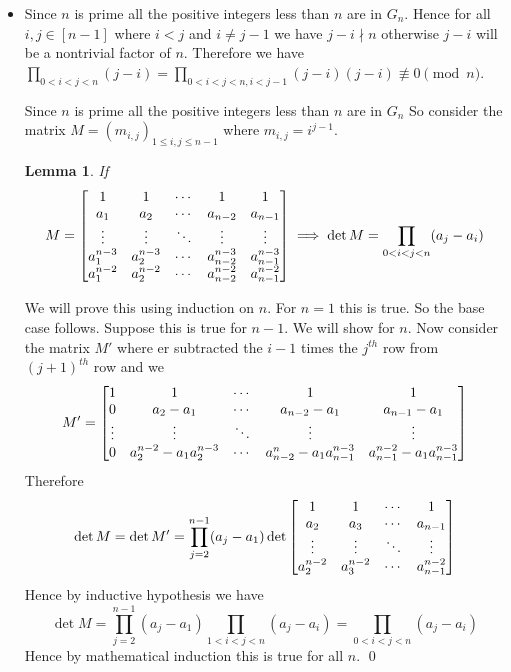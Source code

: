 \documentclass[a4paper, 11pt]{article}
\newtheorem{lemma}{Lemma}
\renewenvironment{proof}{\noindent{\it \textbf{Proof:}}\hspace*{1em}}{\hfill\qed\bigskip\\}
\begin{document}
{\begin{itemize}
\begin{itemize}
		\item \textbf{Commutativity:} Let $a,b\in G_n$. Now we know multiplication of integers follows commutativity. Therefore $a\cdot b=b\cdot a$. Therefore going modulo $n$ we have $a\cdot b\bmod n=b\cdot a\bmod n\implies a\cdot b\equiv b\cdot a\pmod n$.
	\end{itemize}
Therefore $G_n$ is a finite Abelian group.
\item Since $n$ is prime all the positive integers less than $n$ are in $G_n$. Hence for all $i,j\in [n-1]$ where $i<j$ and $i\neq j-1$ we have $j-i\nmid n$ otherwise $j-i$ will be a nontrivial factor of $n$. Therefore we have $\prod\limits_{0<i<j<n}(j-i)=\prod\limits_{0<i<j<n, i<j-1}(j-i)(j-i)\not\equiv 0\pmod n$. \parinn

Since $n$ is prime all the positive integers less than $n$ are in $G_n$ So consider the matrix $M=(m_{i,j})_{1\leq i,j\leq n-1}$ where $m_{i,j}=i^{j-1}$. 
\begin{lemma}
If $$M=\left[\begin{matrix}1&1&\cdots & 1 &1\\a_1&a_2&\cdots &a_{n-2}&a_{n-1}\\\vdots&\vdots&\ddots&\vdots&\vdots\\a_1^{n-3}&a_2^{n-3}&\cdots&a_{n-2}^{n-3}& a_{n-1}^{n-3}\\a_1^{n-2}&a_2^{n-2}&\cdots&a_{n-2}^{n-2}&a_{n-1}^{n-2}\end{matrix}\right]\implies \det M=\prod\limits_{0<i<j<n} (a_j-a_i)$$
\end{lemma}
\begin{proof}
	We will prove this using induction on $n$. For $n=1$ this is true. So the base case follows. Suppose this is true for $n-1$. We will show for $n$. Now consider the matrix $M'$ where er subtracted the $i-1$ times the $j^{th}$ row from $(j+1)^{th}$ row and we $$M'=\left[\begin{matrix}1&1&\cdots & 1 &1\\   0&a_2-a_1&\cdots &a_{n-2}-a_1&a_{n-1}-a_1\\   \vdots&\vdots&\ddots&\vdots&\vdots\\   0&a_2^{n-2}-a_1a_{2}^{n-3}&\cdots&a_{n-2}^n-a_1a_{n-1}^{n-3}& a_{n-1}^{n-2}-a_1a_{n-1}^{n-3}\end{matrix}\right]$$Therefore $$\det M= \det M'=\prod_{j=2}^{n-1} (a_j-a_1)\det \left[\begin{matrix}1& 1&\cdots&1\\a_2&a_3&\cdots&a_{n-1}\\ \vdots&\vdots&\ddots&\vdots\\a_2^{n-2}&a_3^{n-2}&\cdots&a_{n-1}^{n-2}\end{matrix}\right]$$ Hence by inductive hypothesis we have 
	$$\det M=\prod_{j=2}^{n-1} (a_j-a_1) \prod_{1<i<j<n}(a_j-a_i)=\prod\limits_{0<i<j<n} (a_j-a_i)$$Hence by mathematical induction this is true for all $n$.
\end{proof}


\end{itemize}}
\end{document}
